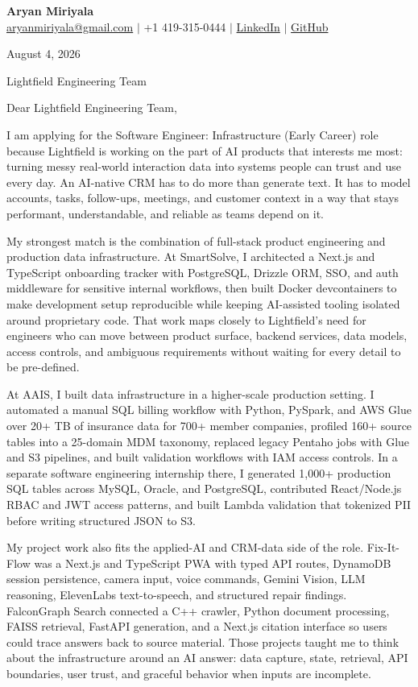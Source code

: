 \documentclass[letterpaper,11pt]{article}
\begin{document}
{\Large\textbf{Aryan Miriyala}}\\
\href{mailto:aryanmiriyala@gmail.com}{aryanmiriyala@gmail.com} $|$ +1 419-315-0444 $|$
\href{https://www.linkedin.com/in/aryan-miriyala-7788a21b6/}{LinkedIn} $|$
\href{https://github.com/aryanmiriyala}{GitHub}

August 4, 2026

Lightfield Engineering Team

Dear Lightfield Engineering Team,

I am applying for the Software Engineer: Infrastructure (Early Career) role because Lightfield is working on the part of AI products that interests me most: turning messy real-world interaction data into systems people can trust and use every day. An AI-native CRM has to do more than generate text. It has to model accounts, tasks, follow-ups, meetings, and customer context in a way that stays performant, understandable, and reliable as teams depend on it.

My strongest match is the combination of full-stack product engineering and production data infrastructure. At SmartSolve, I architected a Next.js and TypeScript onboarding tracker with PostgreSQL, Drizzle ORM, SSO, and auth middleware for sensitive internal workflows, then built Docker devcontainers to make development setup reproducible while keeping AI-assisted tooling isolated around proprietary code. That work maps closely to Lightfield's need for engineers who can move between product surface, backend services, data models, access controls, and ambiguous requirements without waiting for every detail to be pre-defined.

At AAIS, I built data infrastructure in a higher-scale production setting. I automated a manual SQL billing workflow with Python, PySpark, and AWS Glue over 20+ TB of insurance data for 700+ member companies, profiled 160+ source tables into a 25-domain MDM taxonomy, replaced legacy Pentaho jobs with Glue and S3 pipelines, and built validation workflows with IAM access controls. In a separate software engineering internship there, I generated 1,000+ production SQL tables across MySQL, Oracle, and PostgreSQL, contributed React/Node.js RBAC and JWT access patterns, and built Lambda validation that tokenized PII before writing structured JSON to S3.

My project work also fits the applied-AI and CRM-data side of the role. Fix-It-Flow was a Next.js and TypeScript PWA with typed API routes, DynamoDB session persistence, camera input, voice commands, Gemini Vision, LLM reasoning, ElevenLabs text-to-speech, and structured repair findings. FalconGraph Search connected a C++ crawler, Python document processing, FAISS retrieval, FastAPI generation, and a Next.js citation interface so users could trace answers back to source material. Those projects taught me to think about the infrastructure around an AI answer: data capture, state, retrieval, API boundaries, user trust, and graceful behavior when inputs are incomplete.
\end{document}
